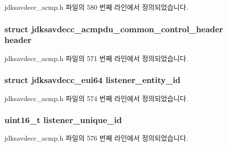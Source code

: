 jdksavdecc\+\_\+acmp.\+h 파일의 580 번째 라인에서 정의되었습니다.

\subsubsection[{\texorpdfstring{header}{header}}]{\setlength{\rightskip}{0pt plus 5cm}struct {\bf jdksavdecc\+\_\+acmpdu\+\_\+common\+\_\+control\+\_\+header} header}\hypertarget{structjdksavdecc__acmpdu_a2c237e845db12511d3ddd73770461bed}{}\label{structjdksavdecc__acmpdu_a2c237e845db12511d3ddd73770461bed}


jdksavdecc\+\_\+acmp.\+h 파일의 571 번째 라인에서 정의되었습니다.

\subsubsection[{\texorpdfstring{listener\+\_\+entity\+\_\+id}{listener_entity_id}}]{\setlength{\rightskip}{0pt plus 5cm}struct {\bf jdksavdecc\+\_\+eui64} listener\+\_\+entity\+\_\+id}\hypertarget{structjdksavdecc__acmpdu_ae204d36de673d5135ef97cc19a344b37}{}\label{structjdksavdecc__acmpdu_ae204d36de673d5135ef97cc19a344b37}


jdksavdecc\+\_\+acmp.\+h 파일의 574 번째 라인에서 정의되었습니다.

\subsubsection[{\texorpdfstring{listener\+\_\+unique\+\_\+id}{listener_unique_id}}]{\setlength{\rightskip}{0pt plus 5cm}uint16\+\_\+t listener\+\_\+unique\+\_\+id}\hypertarget{structjdksavdecc__acmpdu_a13c0b9c45a002c3c35ae4d85a3018c07}{}\label{structjdksavdecc__acmpdu_a13c0b9c45a002c3c35ae4d85a3018c07}


jdksavdecc\+\_\+acmp.\+h 파일의 576 번째 라인에서 정의되었습니다.

